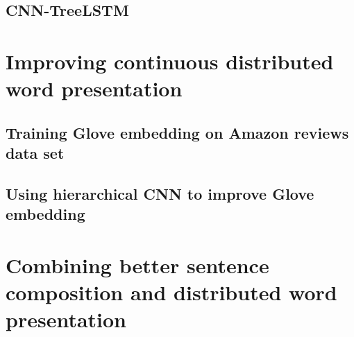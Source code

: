 \subsection{CNN-TreeLSTM}


\section{Improving continuous distributed word presentation}

\subsection{Training Glove embedding on Amazon reviews data set}

\subsection{Using hierarchical CNN to improve Glove embedding}


\section{Combining better sentence composition and distributed word presentation}
